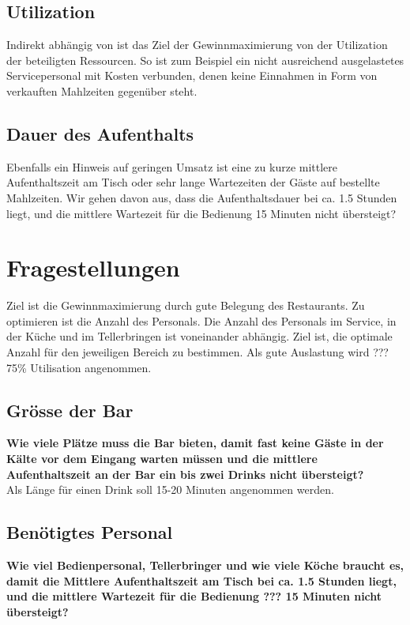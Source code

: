 \documentclass[ngerman,a4paper,12pt]{scrreprt}
\begin{document}
	\subsection{Utilization}
	Indirekt abhängig von ist das Ziel der Gewinnmaximierung von der Utilization der beteiligten Ressourcen. So ist zum Beispiel ein nicht ausreichend ausgelastetes Servicepersonal mit Kosten verbunden, denen keine Einnahmen in Form von verkauften Mahlzeiten gegenüber steht.
	  
	\subsection{Dauer des Aufenthalts}
		Ebenfalls ein Hinweis auf geringen Umsatz ist eine zu kurze mittlere Aufenthaltszeit am Tisch oder sehr lange Wartezeiten der Gäste auf bestellte Mahlzeiten. Wir gehen davon aus, dass die Aufenthaltsdauer bei ca. 1.5 Stunden liegt, und die mittlere Wartezeit für die Bedienung 15 Minuten nicht übersteigt? 


\section{Fragestellungen}
	Ziel ist die Gewinnmaximierung durch gute Belegung des Restaurants. Zu optimieren ist die Anzahl des Personals. Die Anzahl des Personals im Service, in der Küche und im Tellerbringen ist voneinander abhängig. Ziel ist, die optimale Anzahl für den jeweiligen Bereich zu bestimmen. Als gute Auslastung wird ??? 75\% Utilisation angenommen.
	
	\subsection{Grösse der Bar}
		\textbf{Wie viele Plätze muss die Bar bieten, damit fast keine Gäste in der Kälte vor dem Eingang warten müssen und die mittlere Aufenthaltszeit an der Bar ein bis zwei Drinks nicht übersteigt?} \\
		Als Länge für einen Drink soll 15-20 Minuten angenommen werden.

	\subsection{Benötigtes Personal}
		\textbf{Wie viel Bedienpersonal, Tellerbringer und wie viele Köche braucht es, damit die Mittlere Aufenthaltszeit am Tisch bei ca. 1.5 Stunden liegt, und die mittlere Wartezeit für die Bedienung ??? 15 Minuten nicht übersteigt?} \\
\end{document}

